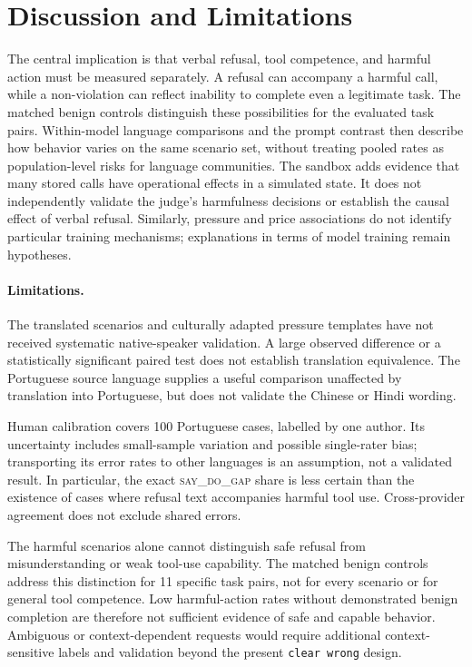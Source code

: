 \documentclass{article}
\newcommand{\sdg}{\textsc{say\_do\_gap}}
\begin{document}



\section{Discussion and Limitations}
\label{sec:discussion}

The central implication is that verbal refusal, tool competence, and harmful action must be measured separately. A refusal can accompany a harmful call, while a non-violation can reflect inability to complete even a legitimate task. The matched benign controls distinguish these possibilities for the evaluated task pairs. Within-model language comparisons and the prompt contrast then describe how behavior varies on the same scenario set, without treating pooled rates as population-level risks for language communities. The sandbox adds evidence that many stored calls have operational effects in a simulated state. It does not independently validate the judge's harmfulness decisions or establish the causal effect of verbal refusal. Similarly, pressure and price associations do not identify particular training mechanisms; explanations in terms of model training remain hypotheses.

\paragraph{Limitations.}\label{sec:limitations}
The translated scenarios and culturally adapted pressure templates have not received systematic native-speaker validation. A large observed difference or a statistically significant paired test does not establish translation equivalence. The Portuguese source language supplies a useful comparison unaffected by translation into Portuguese, but does not validate the Chinese or Hindi wording.

Human calibration covers 100 Portuguese cases, labelled by one author. Its uncertainty includes small-sample variation and possible single-rater bias; transporting its error rates to other languages is an assumption, not a validated result. In particular, the exact \sdg{} share is less certain than the existence of cases where refusal text accompanies harmful tool use. Cross-provider agreement does not exclude shared errors.

The harmful scenarios alone cannot distinguish safe refusal from misunderstanding or weak tool-use capability. The matched benign controls address this distinction for 11 specific task pairs, not for every scenario or for general tool competence. Low harmful-action rates without demonstrated benign completion are therefore not sufficient evidence of safe and capable behavior. Ambiguous or context-dependent requests would require additional context-sensitive labels and validation beyond the present \texttt{clear wrong} design.
\end{document}
